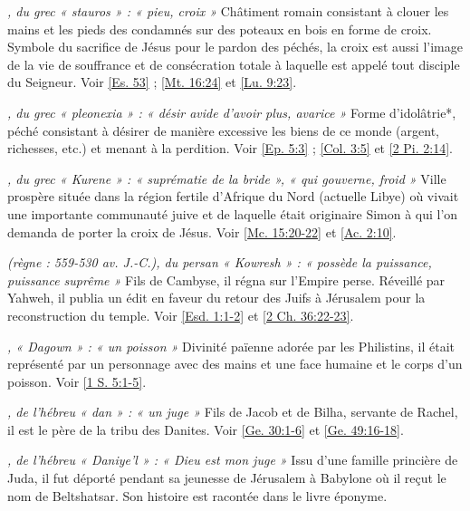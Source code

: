 \begin{multicols}{2}
\textit{, du grec « stauros » : « pieu, croix »}\newline
Châtiment romain consistant à clouer les mains et les pieds des condamnés sur des poteaux en bois en forme de croix. Symbole du sacrifice de Jésus pour le pardon des péchés, la croix est aussi l'image de la vie de souffrance et de consécration totale à laquelle est appelé tout disciple du Seigneur. Voir \vref{Es. 53} ; \vref{Mt. 16:24} et \vref{Lu. 9:23}.

\textit{, du grec « pleonexia » : « désir avide d'avoir plus, avarice »}\newline
Forme d'idolâtrie*, péché consistant à désirer de manière excessive les biens de ce monde (argent, richesses, etc.) et menant à la perdition. Voir \vref{Ep. 5:3} ; \vref{Col. 3:5} et \vref{2 Pi. 2:14}.

\textit{, du grec « Kurene » : « suprématie de la bride », « qui gouverne, froid »}\newline
Ville prospère située dans la région fertile d'Afrique du Nord (actuelle Libye) où vivait une importante communauté juive et de laquelle était originaire Simon à qui l'on demanda de porter la croix de Jésus. Voir \vref{Mc. 15:20-22} et \vref{Ac. 2:10}.

\textit{(règne : 559-530 av. J.-C.), du persan « Kowresh » : « possède la puissance, puissance suprême »}\newline
Fils de Cambyse, il régna sur l'Empire perse. Réveillé par Yahweh, il publia un édit en faveur du retour des Juifs à Jérusalem pour la reconstruction du temple. Voir \vref{Esd. 1:1-2} et \vref{2 Ch. 36:22-23}.

\textit{, « Dagown » : « un poisson »}\newline
Divinité païenne adorée par les Philistins, il était représenté par un personnage avec des mains et une face humaine et le corps d'un poisson. Voir \vref{1 S. 5:1-5}.

\textit{, de l'hébreu « dan » : « un juge »}\newline
Fils de Jacob et de Bilha, servante de Rachel, il est le père de la tribu des Danites. Voir \vref{Ge. 30:1-6} et \vref{Ge. 49:16-18}.

\textit{, de l'hébreu « Daniye'l » : « Dieu est mon juge »}\newline
Issu d'une famille princière de Juda, il fut déporté pendant sa jeunesse de Jérusalem à Babylone où il reçut le nom de Beltshatsar. Son histoire est racontée dans le livre éponyme.


\end{multicols}
